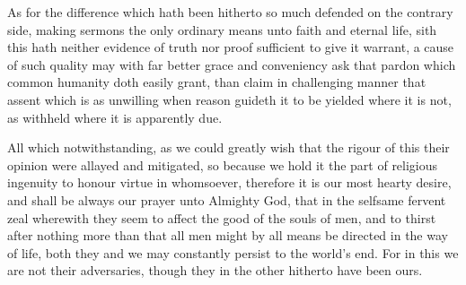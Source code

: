 As for the difference which hath been hitherto so much defended on the contrary side,
 making sermons the only ordinary means unto faith and eternal life, sith this hath neither evidence of truth nor proof sufficient to give it warrant, a cause of such quality may with far better grace and conveniency ask that pardon which common humanity doth easily grant, than claim in challenging manner that assent which is as unwilling when reason guideth it to be yielded where it is not, as withheld where it is apparently due.

All which notwithstanding, as we could greatly wish that the rigour of this their opinion were allayed and mitigated, so because we hold it the part of religious ingenuity to honour virtue in whomsoever, therefore it is our most hearty desire, and shall be always our prayer unto Almighty God, that in the selfsame fervent zeal wherewith they seem to affect the good of the souls of men, and to thirst after nothing more than that all men might by all means be directed in the way of life, both they and we may constantly persist to the world’s end. For in this we are not their adversaries, though they in the other hitherto have been ours.


